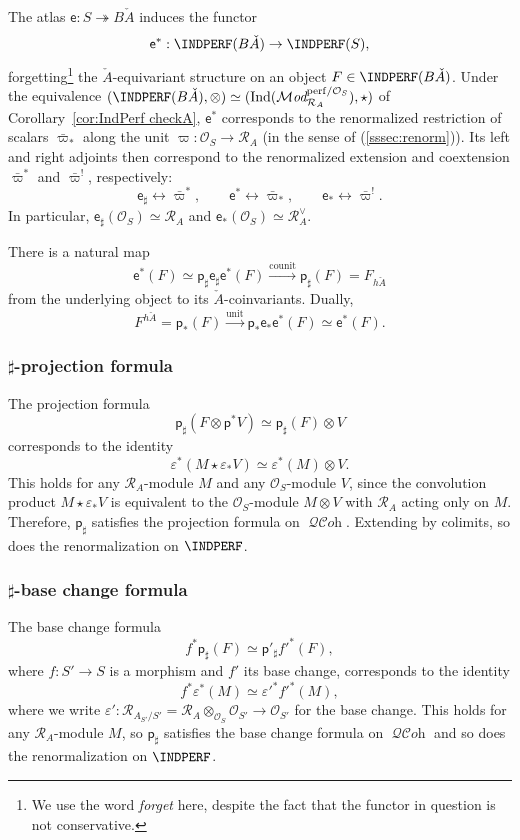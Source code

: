 \documentclass[12pt, oneside]{amsart}
\numberwithin{equation}{section}
\theoremstyle{remark}
\theoremstyle{plain}
\newcommand{\MOD}{\mathcal{M}\textit{od}}
\DeclareMathOperator{\QCOH}{\mathcal{QC}\textit{oh}}
\newcommand{\R}{\mathcal{R}}
\newcommand{\RA}{\R_A}
\newcommand{\OO}{\mathcal{O}}
\newcommand{\Ind}{\operatorname{Ind}}
\newcommand{\eps}{\varepsilon}
\newcommand{\varpib}{\bar{\varpi}}
\newcommand{\sfp}{\mathsf{p}}
\newcommand{\sfe}{\mathsf{e}}
\begin{document}
\subsubsection{}\label{sssec:map to coinvariants}

The atlas $\sfe : S \twoheadrightarrow B\check{A}$ induces the functor
\[ \sfe^* : \INDPERF(B\check{A}) \to \INDPERF(S), \]
forgetting\footnote{We use the word \emph{forget} here, despite the fact that the functor in question is not conservative.} the $\check{A}$-equivariant structure on an object $F \in \INDPERF(B\check{A})$.
Under the equivalence $(\INDPERF(B\check{A}), \otimes) \simeq (\Ind(\MOD_{\RA}^{\mathrm{perf}/\OO_S}), \star)$ of Corollary~\ref{cor:IndPerf checkA}, $\sfe^*$ corresponds to the renormalized restriction of scalars $\varpib_*$ along the unit $\varpi : \OO_S \to \RA$ (in the sense of (\ref{sssec:renorm})).
Its left and right adjoints then correspond to the renormalized extension and coextension $\varpib^*$ and $\varpib^!$, respectively:
\[
  \sfe_\sharp \leftrightarrow \varpib^*, \qquad
  \sfe^* \leftrightarrow \varpib_*, \qquad
  \sfe_* \leftrightarrow \varpib^!.
\]
In particular, $\sfe_\sharp(\OO_S) \simeq \RA$ and $\sfe_*(\OO_S) \simeq \RA^\vee$.

There is a natural map
\[
  \sfe^*(F)
  \simeq \sfp_\sharp \sfe_\sharp \sfe^*(F)
  \xrightarrow{\mathrm{counit}} \sfp_\sharp(F)
  = F_{h\check{A}}
\]
from the underlying object to its $\check{A}$-coinvariants.
Dually,
\[
  F^{h\check{A}} = \sfp_*(F)
  \xrightarrow{\mathrm{unit}} \sfp_* \sfe_* \sfe^*(F)
  \simeq \sfe^*(F).
\]

\subsubsection{$\sharp$-projection formula}
The projection formula
$$ \sfp_\sharp(F \otimes \sfp^*V) \simeq \sfp_\sharp(F)\otimes V $$
corresponds to the identity
$$ \eps^*(M \star \eps_*V) \simeq \eps^*(M) \otimes V. $$
This holds for any $\RA$-module $M$ and any $\OO_S$-module $V$, since the convolution product $M \star \eps_*V$ is equivalent to the $\OO_S$-module $M \otimes V$ with $\RA$ acting only on $M$.
Therefore, $\sfp_\sharp$ satisfies the projection formula on $\QCOH$.
Extending by colimits, so does the renormalization on $\INDPERF$.

\subsubsection{$\sharp$-base change formula}
The base change formula
$$ f^* \sfp_\sharp (F) \simeq \sfp'_{\sharp} f'^* (F), $$
where $f : S' \to S$ is a morphism and $f'$ its base change, corresponds to the identity
$$ f^* \eps^*(M) \simeq \eps'^* f'^*(M), $$
where we write $\eps' : \R_{A_{S'}/S'} = \RA \otimes_{\OO_S} \OO_{S'} \to \OO_{S'}$ for the base change.
This holds for any $\RA$-module $M$, so $\sfp_\sharp$ satisfies the base change formula on $\QCOH$ and so does the renormalization on $\INDPERF$.
\end{document}
